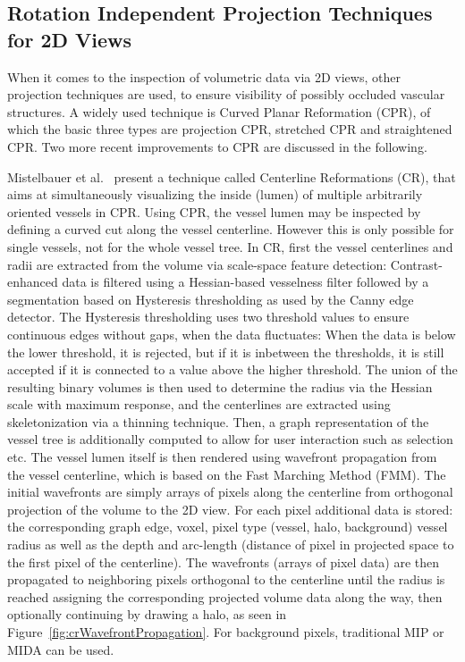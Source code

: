 \subsection*{Rotation Independent Projection Techniques for 2D Views}

When it comes to the inspection of volumetric data via 2D views, other projection techniques are used, to ensure visibility of possibly occluded vascular structures. A widely used technique is Curved Planar Reformation (CPR), of which the basic three types are projection CPR, stretched CPR and straightened CPR. Two more recent improvements to CPR are discussed in the following.

Mistelbauer et al.~\cite{mistelbauer2010automated} present a technique called Centerline Reformations (CR), that aims at simultaneously visualizing the inside (lumen) of multiple arbitrarily oriented vessels in CPR. Using CPR, the vessel lumen may be inspected by defining a curved cut along the vessel centerline. However this is only possible for single vessels, not for the whole vessel tree. In CR, first the vessel centerlines and radii are extracted from the volume via scale-space feature detection: Contrast-enhanced data is filtered using a Hessian-based vesselness filter followed by a segmentation based on Hysteresis thresholding as used by the Canny edge detector. The Hysteresis thresholding uses two threshold values to ensure continuous edges without gaps, when the data fluctuates: When the data is below the lower threshold, it is rejected, but if it is inbetween the thresholds, it is still accepted if it is connected to a value above the higher threshold. The union of the resulting binary volumes is then used to determine the radius via the Hessian scale with maximum response, and the centerlines are extracted using skeletonization via a thinning technique. Then, a graph representation of the vessel tree is additionally computed to allow for user interaction such as selection etc. The vessel lumen itself is then rendered using wavefront propagation from the vessel centerline, which is based on the Fast Marching Method (FMM). The initial wavefronts are simply arrays of pixels along the centerline from orthogonal projection of the volume to the 2D view. For each pixel additional data is stored: the corresponding graph edge, voxel, pixel type (vessel, halo, background) vessel radius as well as the depth and arc-length (distance of pixel in projected space to the first pixel of the centerline). The wavefronts (arrays of pixel data) are then propagated to neighboring pixels orthogonal to the centerline until the radius is reached assigning the corresponding projected volume data along the way, then optionally continuing by drawing a halo, as seen in Figure~\ref{fig:crWavefrontPropagation}. For background pixels, traditional MIP or MIDA can be used.
